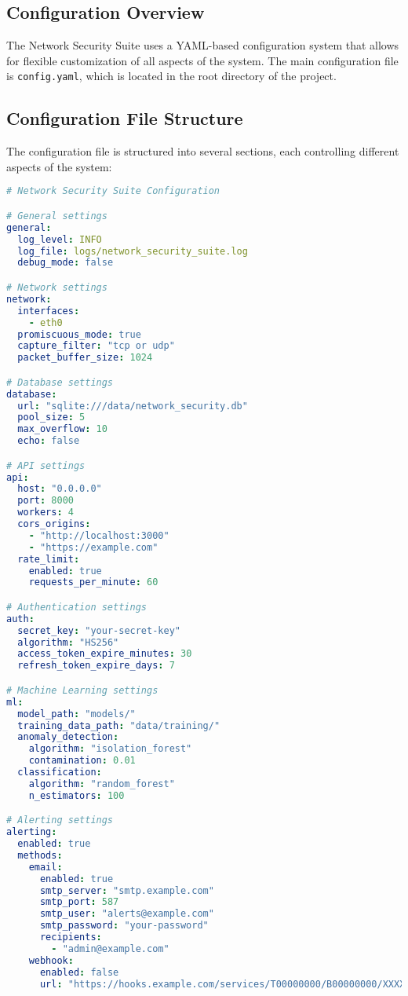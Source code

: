 \subsection{Configuration Overview}
The Network Security Suite uses a YAML-based configuration system that allows for flexible customization of all aspects of the system. The main configuration file is \texttt{config.yaml}, which is located in the root directory of the project.

\subsection{Configuration File Structure}
The configuration file is structured into several sections, each controlling different aspects of the system:

\begin{lstlisting}[language=yaml, caption=Configuration File Structure]
# Network Security Suite Configuration

# General settings
general:
  log_level: INFO
  log_file: logs/network_security_suite.log
  debug_mode: false

# Network settings
network:
  interfaces:
    - eth0
  promiscuous_mode: true
  capture_filter: "tcp or udp"
  packet_buffer_size: 1024

# Database settings
database:
  url: "sqlite:///data/network_security.db"
  pool_size: 5
  max_overflow: 10
  echo: false

# API settings
api:
  host: "0.0.0.0"
  port: 8000
  workers: 4
  cors_origins:
    - "http://localhost:3000"
    - "https://example.com"
  rate_limit:
    enabled: true
    requests_per_minute: 60

# Authentication settings
auth:
  secret_key: "your-secret-key"
  algorithm: "HS256"
  access_token_expire_minutes: 30
  refresh_token_expire_days: 7

# Machine Learning settings
ml:
  model_path: "models/"
  training_data_path: "data/training/"
  anomaly_detection:
    algorithm: "isolation_forest"
    contamination: 0.01
  classification:
    algorithm: "random_forest"
    n_estimators: 100

# Alerting settings
alerting:
  enabled: true
  methods:
    email:
      enabled: true
      smtp_server: "smtp.example.com"
      smtp_port: 587
      smtp_user: "alerts@example.com"
      smtp_password: "your-password"
      recipients:
        - "admin@example.com"
    webhook:
      enabled: false
      url: "https://hooks.example.com/services/T00000000/B00000000/XXXXXXXXXXXXXXXXXXXXXXXX"
\end{lstlisting}

